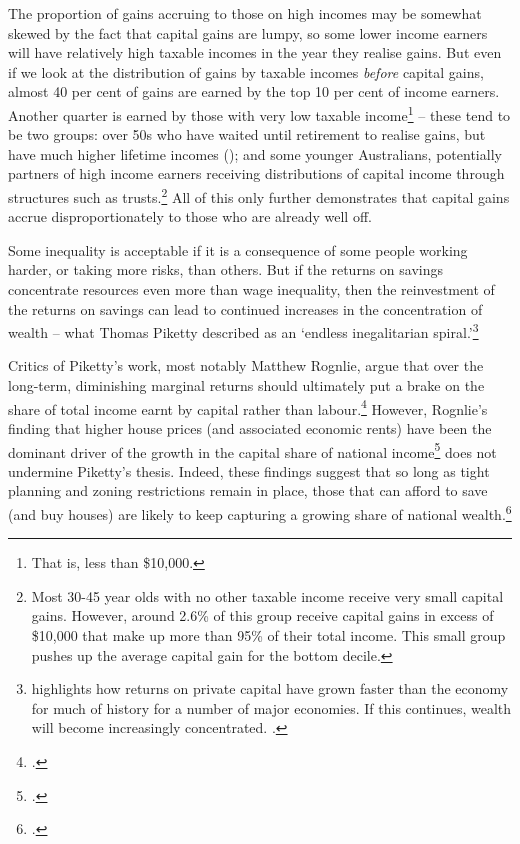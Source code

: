 \documentclass{grattanAlpha}\usepackage[]{graphicx}\usepackage[]{color}
\begin{document}
The proportion of gains accruing to those on high incomes may be somewhat skewed by the fact that capital gains are lumpy, so some lower income earners will have relatively high taxable incomes in the year they realise gains. But even if we look at the distribution of gains by taxable incomes \emph{before} capital gains, almost 40 per cent of gains are earned by the top 10 per cent of income earners. Another quarter is earned by those with very low taxable income\footnote{That is, less than \$10,000.}  – these tend to be two groups: over 50s who have waited until retirement to realise gains, but have much higher lifetime incomes (); and some younger Australians, potentially partners of high income earners receiving distributions of capital income through structures such as trusts.\footnote{Most 30-45 year olds with no other taxable income receive very small capital gains. However, around 2.6\% of this group receive capital gains in excess of \$10,000 that make up more than 95\% of their total income. This small group pushes up the average capital gain for the bottom decile.} All of this only further demonstrates that capital gains accrue disproportionately to those who are already well off. 

Some inequality is acceptable if it is a consequence of some people working harder, or taking more risks, than others. But if the returns on savings concentrate resources even more than wage inequality, then the reinvestment of the returns on savings can lead to continued increases in the concentration of wealth – what Thomas Piketty described as an ‘endless inegalitarian spiral.’\footnote{\textcite{Piketty2013} highlights how returns on private capital have grown faster than the economy for much of history for a number of major economies. If this continues, wealth will become increasingly concentrated. \textcite[See also:][]{Leigh2013}.}

Critics of Piketty’s work, most notably Matthew Rognlie, argue that over the long-term, diminishing marginal returns should ultimately put a brake on the share of total income earnt by capital rather than labour.\footcite[][2]{Rognlie2014OnPiketty} However, Rognlie’s finding that higher house prices (and associated economic rents) have been the dominant driver of the growth in the capital share of national income\footcite[][3]{Rognlie2014OnPiketty} does not undermine Piketty’s thesis. Indeed, these findings suggest that so long as tight planning and zoning restrictions remain in place, those that can afford to save (and buy houses) are likely to keep capturing a growing share of national wealth.\footcite[See:][]{TheEconomist2015NIMBYs}  
\end{document}
